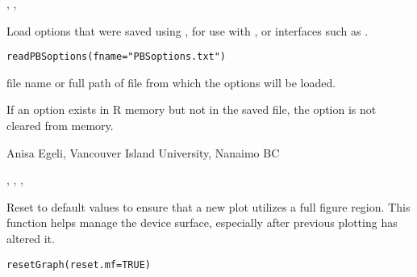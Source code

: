 \documentclass[letterpaper]{book}
\begin{document}
%
\begin{SeeAlso}\relax
{}, , 
\end{SeeAlso}
%
\begin{Description}\relax
Load options that were saved using , for use
with ,  or interfaces such as
.
\end{Description}
%
\begin{Usage}
\begin{verbatim}
readPBSoptions(fname="PBSoptions.txt")
\end{verbatim}
\end{Usage}
%
\begin{Arguments}
\begin{ldescription}
\item[\code{fname}] file name or full path of file from which the options will be loaded.
\end{ldescription}
\end{Arguments}
%
\begin{Note}\relax
If an option exists in R memory but not in the saved file, 
the option is not cleared from memory.
\end{Note}
%
\begin{Author}\relax
Anisa Egeli, Vancouver Island University, Nanaimo BC
\end{Author}
%
\begin{SeeAlso}\relax
{}, ,
, 
\end{SeeAlso}
%
\begin{Description}\relax
Reset  to default values to ensure that a new plot 
utilizes a full figure region. This function helps manage the device 
surface, especially after previous plotting has altered it.
\end{Description}
%
\begin{Usage}
\begin{verbatim}
resetGraph(reset.mf=TRUE)
\end{verbatim}
\end{Usage}
\end{document}
